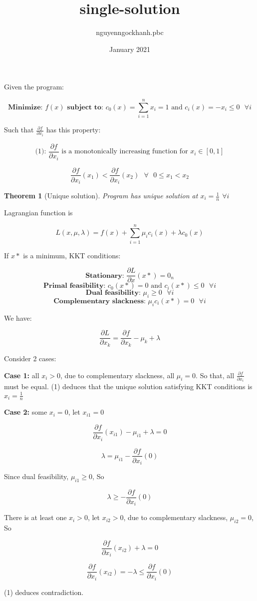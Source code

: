 \documentclass{article}
\title{single-solution}
\author{nguyenngockhanh.pbc }
\date{January 2021}
\newtheorem{theorem}{Theorem}
\begin{document}
    Given the program:

    \[
        \textbf{Minimize: } f(x)
        \textbf{ subject to: } c_0(x) = \sum_{i=1}^{n} x_i = 1 \text{ and } c_i(x) = -x_i \leq 0 \text{ } \forall i
    \]


    Such that $\frac{\partial f}{\partial x_i}$ has this property:

    \[
        \text{(1): } \text{$\frac{\partial f}{\partial x_i}$ is a monotonically increasing function for $x_i \in [0, 1]$}
    \]

    \[
        \frac{\partial f}{\partial x_i}(x_1) < \frac{\partial f}{\partial x_i}(x_2) \text{ } \forall \text{ } 0 \leq x_1 < x_2
    \]

    \begin{theorem}[Unique solution]
        \label{theo:unique}
        Program has unique solution at $x_i = \frac{1}{n}$ $\forall i$
    \end{theorem}

    Lagrangian function is

    \[
        L(x, \mu, \lambda) = f(x) + \sum_{i=1}^{n} \mu_i c_i(x) + \lambda c_0(x)
    \]

    If $x*$ is a minimum, KKT conditions:

    \[
        \textbf{Stationary: } \frac{\partial L}{\partial x}(x*) = 0_n
    \]
    \[
        \textbf{Primal feasibility: } c_0(x*) = 0 \text{ and } c_i(x*) \leq 0 \text{ } \forall i
    \]
    \[
        \textbf{Dual feasibility: } \mu_i \geq 0 \text{ } \forall i
    \]
    \[
        \textbf{Complementary slackness: } \mu_i c_i(x*) = 0 \text{ } \forall i
    \]

    We have:

    \[
        \frac{\partial L}{\partial x_k} = \frac{\partial f}{\partial x_k} - \mu_k + \lambda
    \]

    Consider 2 cases:

    \textbf{Case 1:} all $x_i > 0$, due to complementary slackness, all $\mu_i = 0$. So that, all $\frac{\partial f}{\partial x_i}$ must be equal. (1) deduces that the unique solution satisfying KKT conditions is $x_i = \frac{1}{n}$

    \textbf{Case 2:} some $x_i = 0$, let $x_{i1} = 0$

    \[
        \frac{\partial f}{\partial x_i}(x_{i1}) - \mu_{i1} + \lambda = 0
    \]

    \[
        \lambda = \mu_{i1} - \frac{\partial f}{\partial x_i}(0)
    \]

    Since dual feasibility, $\mu_{i1} \geq 0$, So

    \[
        \lambda \geq - \frac{\partial f}{\partial x_i}(0)
    \]

    There is at least one $x_i > 0$, let $x_{i2} > 0$, due to complementary slackness, $\mu_{i2} = 0$, So

    \[
        \frac{\partial f}{\partial x_i}(x_{i2}) + \lambda = 0
    \]

    \[
        \frac{\partial f}{\partial x_i}(x_{i2}) = - \lambda \leq \frac{\partial f}{\partial x_i}(0)
    \]

    (1) deduces contradiction.
\end{document}
